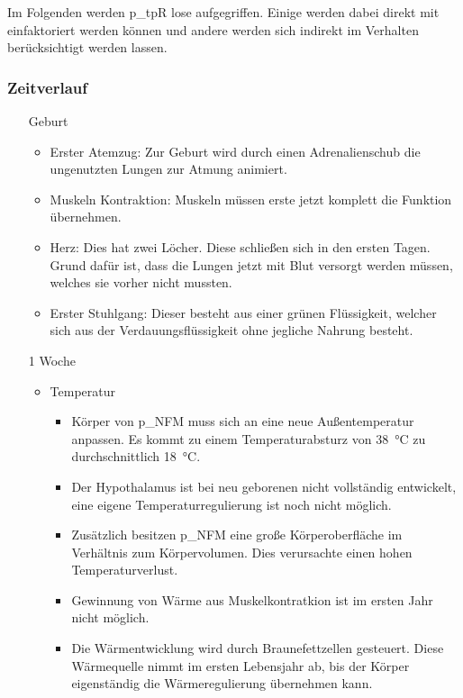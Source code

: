 Im Folgenden werden \gls{p_tpR} lose aufgegriffen. Einige werden dabei direkt mit einfaktoriert werden können und andere werden sich indirekt im Verhalten berücksichtigt werden lassen.\\
	
\subsubsection{Zeitverlauf}
\begin{enumerate}%
	\item[Geburt]
	\begin{itemize}
		\item Erster Atemzug: Zur Geburt wird durch einen Adrenalienschub die ungenutzten Lungen zur Atmung animiert.
		\item Muskeln Kontraktion: Muskeln müssen erste jetzt komplett die Funktion übernehmen.
		\item Herz: Dies hat zwei Löcher. Diese schließen sich in den ersten Tagen. Grund dafür ist, dass die Lungen jetzt mit Blut versorgt werden müssen, welches sie vorher nicht mussten.
		\item Erster Stuhlgang: Dieser besteht aus einer grünen Flüssigkeit, welcher sich aus der Verdauungsflüssigkeit ohne jegliche Nahrung besteht.
	\end{itemize}
	\item[1 Woche]
	\begin{itemize}
		\item Temperatur
		\begin{itemize}
			\item Körper von \gls{p_NFM} muss sich an eine neue Außentemperatur anpassen. Es kommt zu einem Temperaturabsturz von \SI{38}{\celsius} zu durchschnittlich \SI{18}{\celsius}.
			\item Der Hypothalamus ist bei neu geborenen nicht vollständig entwickelt, eine eigene Temperaturregulierung ist noch nicht möglich.
			\item Zusätzlich besitzen \gls{p_NFM} eine große Körperoberfläche im Verhältnis zum Körpervolumen. Dies verursachte einen hohen Temperaturverlust. 
			\item Gewinnung von Wärme aus Muskelkontratkion ist im ersten Jahr nicht möglich.
			\item Die Wärmentwicklung wird durch Braunefettzellen gesteuert. Diese Wärmequelle nimmt im ersten Lebensjahr ab, bis der Körper eigenständig die Wärmeregulierung übernehmen kann.
			\begin{figure}[H]

\end{figure}
\end{itemize}
\end{itemize}
\end{enumerate}

